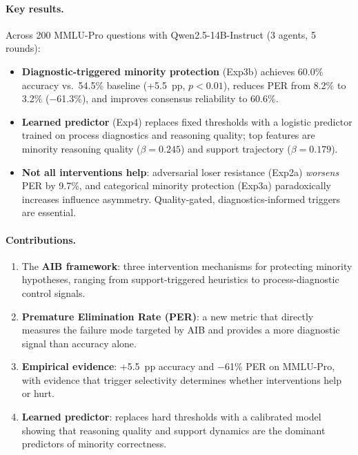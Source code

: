 \paragraph{Key results.}
Across 200 MMLU-Pro questions with Qwen2.5-14B-Instruct (3 agents, 5 rounds):
\begin{itemize}[noitemsep,topsep=2pt]
  \item \textbf{Diagnostic-triggered minority protection} (Exp3b) achieves
        60.0\% accuracy vs.\ 54.5\% baseline (+5.5~pp, $p\!<\!0.01$),
        reduces PER from 8.2\% to 3.2\% (−61.3\%), and improves consensus
        reliability to 60.6\%.
  \item \textbf{Learned predictor} (Exp4) replaces fixed thresholds with a
        logistic predictor trained on process diagnostics and reasoning
        quality; top features are minority reasoning quality ($\beta=0.245$)
        and support trajectory ($\beta=0.179$).
  \item \textbf{Not all interventions help}: adversarial loser resistance
        (Exp2a) \emph{worsens} PER by 9.7\%, and categorical minority
        protection (Exp3a) paradoxically increases influence asymmetry.
        Quality-gated, diagnostics-informed triggers are essential.
\end{itemize}

\paragraph{Contributions.}
\begin{enumerate}[noitemsep,topsep=2pt]
  \item The \textbf{AIB framework}: three intervention mechanisms for
        protecting minority hypotheses, ranging from support-triggered
        heuristics to process-diagnostic control signals.
  \item \textbf{Premature Elimination Rate (PER)}: a new metric that
        directly measures the failure mode targeted by AIB and provides a
        more diagnostic signal than accuracy alone.
  \item \textbf{Empirical evidence}: +5.5~pp accuracy and −61\% PER on
        MMLU-Pro, with evidence that trigger selectivity determines whether
        interventions help or hurt.
  \item \textbf{Learned predictor}: replaces hard thresholds with a
        calibrated model showing that reasoning quality and support
        dynamics are the dominant predictors of minority correctness.
\end{enumerate}
